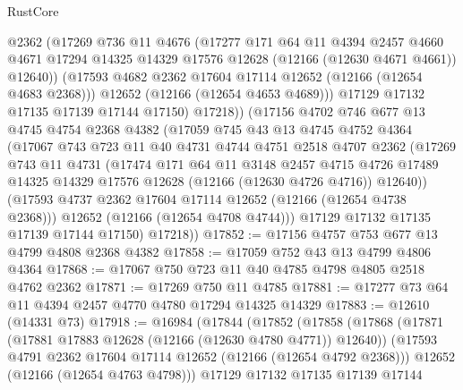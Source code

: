 \begin{lexlean}{RustCore}
\begin{coremodule}
              @2362
              (@17269
                @736
                @11
                @4676
                (@17277
                  @171
                  @64
                  @11
                  @4394
                  @2457
                  @4660
                  @4671
                  @17294
                  @14325
                  @14329
                  @17576
                  @12628
                  (@12166 (@12630 @4671 @4661))
                  @12640))
              (@17593 @4682 @2362 @17604 @17114 @12652 (@12166 (@12654 @4683 @2368)))
              @12652
              (@12166 (@12654 @4653 @4689)))
            @17129
            @17132
            @17135
            @17139
            @17144
            @17150)
          @17218))
      (@17156
        @4702
        @746
        @677
        @13
        @4745
        @4754
        @2368
        @4382
        (@17059
          @745
          @43
          @13
          @4745
          @4752
          @4364
          (@17067
            @743
            @723
            @11
            @40
            @4731
            @4744
            @4751
            @2518
            @4707
            @2362
            (@17269
              @743
              @11
              @4731
              (@17474
                @171
                @64
                @11
                @3148
                @2457
                @4715
                @4726
                @17489
                @14325
                @14329
                @17576
                @12628
                (@12166 (@12630 @4726 @4716))
                @12640))
            (@17593 @4737 @2362 @17604 @17114 @12652 (@12166 (@12654 @4738 @2368)))
            @12652
            (@12166 (@12654 @4708 @4744)))
          @17129
          @17132
          @17135
          @17139
          @17144
          @17150)
        @17218))
@17852 := @17156 @4757 @753 @677 @13 @4799 @4808 @2368 @4382
@17858 := @17059 @752 @43 @13 @4799 @4806 @4364
@17868 := @17067 @750 @723 @11 @40 @4785 @4798 @4805 @2518 @4762 @2362
@17871 := @17269 @750 @11 @4785
@17881 := @17277 @73 @64 @11 @4394 @2457 @4770 @4780 @17294 @14325 @14329
@17883 := @12610 (@14331 @73)
@17918 := @16984
    (@17844
      (@17852
        (@17858
          (@17868
            (@17871 (@17881 @17883 @12628 (@12166 (@12630 @4780 @4771)) @12640))
            (@17593 @4791 @2362 @17604 @17114 @12652 (@12166 (@12654 @4792 @2368)))
            @12652
            (@12166 (@12654 @4763 @4798)))
          @17129
          @17132
          @17135
          @17139
          @17144

\end{coremodule}
\end{lexlean}
